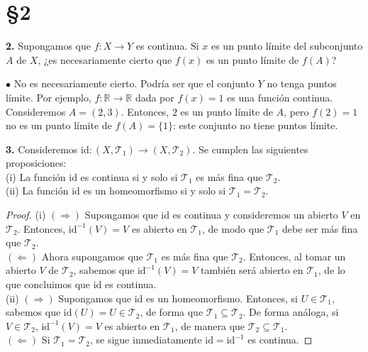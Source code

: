 \documentclass{article}
\begin{document}
\section*{§2 }

\begin{mybox}
	\textbf{2. }  Supongamos que $f: X \rightarrow Y$ es continua. Si $x$ es un punto límite del subconjunto $A$ de $X$, ¿es necesariamente cierto que $f(x)$ es un punto límite de $f(A)$? 
\end{mybox}	

$\bullet$ No es necesariamente cierto. Podría ser que el conjunto $Y$ no tenga puntos límite. Por ejemplo, $f: \mathbb{R} \rightarrow \mathbb{R}$ dada por $f(x) = 1$ es una función continua. Consideremos $A = (2,3)$.  Entonces, $2$ es un punto límite de $A$, pero $f(2) = 1$ no es un punto límite de $f(A) = \{ 1 \}$: este conjunto no tiene puntos límite. 

\begin{mybox}
	\textbf{3. } Consideremos $\text{id}: (X, \mathcal{T}_{1}) \rightarrow (X, \mathcal{T}_{2})$. Se cumplen las siguientes proposiciones: \\
	
	(i) La función $\text{id}$ es continua si y solo si $\mathcal{T}_{1}$ es más fina que $\mathcal{T}_{2}$. \\
	
	(ii) La función id es un homeomorfismo si y solo si $\mathcal{T}_{1} = \mathcal{T}_{2}$.  
\end{mybox}	
\begin{proof}
	(i) $(\Rightarrow)$ Supongamos que id es continua y consideremos un abierto $V$ en $\mathcal{T}_{2}$. Entonces, $\text{id}^{-1}(V) = V$ es abierto en $\mathcal{T}_{1}$, de modo que $\mathcal{T}_{1}$ debe ser más fina que $\mathcal{T}_{2}$. \\
	$(\Leftarrow)$ Ahora supongamos que $\mathcal{T}_{1}$ es más fina que $\mathcal{T}_{2}$. Entonces, al tomar un abierto $V$ de $\mathcal{T}_{2}$, sabemos que $\text{id}^{-1}(V) = V$ también será abierto en $\mathcal{T}_{1}$, de lo que concluimos que id es continua. \\
	
	(ii) $(\Rightarrow)$ Supongamos que id es un homeomorfismo. Entonces, si $U \in \mathcal{T}_{1}$, sabemos que $\text{id}(U) = U \in \mathcal{T}_{2}$, de forma que $\mathcal{T}_{1} \subseteq \mathcal{T}_{2}$.   De forma análoga, si $V \in \mathcal{T}_{2}$, $\text{id}^{-1}(V) = V$ es abierto en $\mathcal{T}_{1}$, de manera que $\mathcal{T}_{2} \subseteq \mathcal{T}_{1}$. \\
	$(\Leftarrow)$ Si $\mathcal{T}_{1} = \mathcal{T}_{2}$, se sigue inmediatamente $\text{id} = \text{id}^{-1}$ es continua.  
\end{proof}
\end{document}
